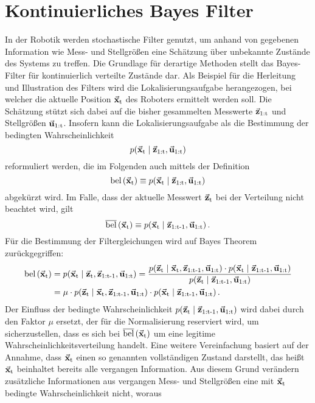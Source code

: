 \section{Kontinuierliches Bayes Filter}
In der Robotik werden stochastische Filter genutzt, um anhand von gegebenen Information wie Mess- und Stellgrößen eine Schätzung über unbekannte Zustände des Systems zu treffen. Die Grundlage für derartige Methoden stellt das Bayes-Filter für kontinuierlich verteilte Zustände dar. Als Beispiel für die Herleitung und Illustration des Filters wird die Lokalisierungsaufgabe herangezogen, bei welcher die aktuelle Position $\vec{\mathbf{x}}_{\text{t}}$ des Roboters ermittelt werden soll. Die Schätzung stützt sich dabei auf die bisher gesammelten Messwerte $\vec{\mathbf{z}}_{\text{1:t}}$ und Stellgrößen $\vec{\mathbf{u}}_{\text{1:t}}$. Insofern kann die Lokalisierungsaufgabe als die Bestimmung der bedingten Wahrscheinlichkeit
\begin{equation}
p({\vec{\mathbf{x}}_{\text{t}}} \hspace{1mm} \vert \hspace{1mm} {\vec{\mathbf{z}}_{\text{1:t}},\vec{\mathbf{u}}_{\text{1:t}}})
\end{equation}
reformuliert werden, die im Folgenden auch mittels der Definition
\begin{equation}
\text{bel}\left({\vec{\mathbf{x}}_{\text{t}}}\right) \equiv p({\vec{\mathbf{x}}_{\text{t}}} \hspace{1mm} \vert \hspace{1mm} {\vec{\mathbf{z}}_{\text{1:t}},\vec{\mathbf{u}}_{\text{1:t}}})
\end{equation}
abgekürzt wird. Im Falle, dass der aktuelle Messwert $\vec{\mathbf{z}}_{\text{t}}$ bei der Verteilung nicht beachtet wird, gilt
\begin{equation}
\overline{\text{bel}}\left({\vec{\mathbf{x}}_{\text{t}}}\right) \equiv p({\vec{\mathbf{x}}_{\text{t}}} \hspace{1mm} \vert \hspace{1mm} {\vec{\mathbf{z}}_{\text{1:t-1}},\vec{\mathbf{u}}_{\text{1:t}}})\,.
\end{equation}
Für die Bestimmung der Filtergleichungen wird auf Bayes Theorem zurückgegriffen:
\begin{equation}
\begin{split}
\text{bel}\left({\vec{\mathbf{x}}_{\text{t}}}\right) &= p({\vec{\mathbf{x}}_{\text{t}}} \hspace{1mm} \vert \hspace{1mm} {\vec{\mathbf{z}}_{\text{t}},\vec{\mathbf{z}}_{\text{1:t-1}},\vec{\mathbf{u}}_{\text{1:t}}}) = \frac{ p({\vec{\mathbf{z}}_{\text{t}}} \hspace{1mm} \vert \hspace{1mm} {\vec{\mathbf{x}}_{\text{t}},\vec{\mathbf{z}}_{\text{1:t-1}},\vec{\mathbf{u}}_{\text{1:t}}})\cdot p({\vec{\mathbf{x}}_{\text{t}}} \hspace{1mm} \vert \hspace{1mm} {\vec{\mathbf{z}}_{\text{1:t-1}},\vec{\mathbf{u}}_{\text{1:t}}})}{p({\vec{\mathbf{z}}_{\text{t}}} \hspace{1mm} \vert \hspace{1mm} {\vec{\mathbf{z}}_{\text{1:t-1}}, \vec{\mathbf{u}}_{\text{1:t}}})}
\\
&= \mu \cdot p({\vec{\mathbf{z}}_{\text{t}}} \hspace{1mm} \vert \hspace{1mm} {\vec{\mathbf{x}}_{\text{t}},\vec{\mathbf{z}}_{\text{1:t-1}},\vec{\mathbf{u}}_{\text{1:t}}})\cdot p({\vec{\mathbf{x}}_{\text{t}}} \hspace{1mm} \vert \hspace{1mm} {\vec{\mathbf{z}}_{\text{1:t-1}},\vec{\mathbf{u}}_{\text{1:t}}})\,.
\end{split}
\end{equation}
Der Einfluss der bedingte Wahrscheinlichkeit $p({\vec{\mathbf{z}}_{\text{t}}} \hspace{1mm} \vert \hspace{1mm} {\vec{\mathbf{z}}_{\text{1:t-1}}, \vec{\mathbf{u}}_{\text{1:t}}})$ wird dabei durch den Faktor $\mu$ ersetzt, der für die Normalisierung reserviert wird, um sicherzustellen, dass es sich bei $\overline{\text{bel}}\left({\vec{\mathbf{x}}_{\text{t}}}\right)$ um eine legitime Wahrscheinlichkeitsverteilung handelt. Eine weitere Vereinfachung basiert auf der Annahme, dass $\vec{\mathbf{x}}_{\text{t}}$ einen so genannten vollständigen Zustand darstellt, das heißt $\vec{\mathbf{x}}_{\text{t}}$ beinhaltet bereits alle vergangen Information. Aus diesem Grund verändern zusätzliche Informationen aus vergangen Mess- und Stellgrößen eine mit $\vec{\mathbf{x}}_{\text{t}}$ bedingte Wahrscheinlichkeit nicht, woraus 
